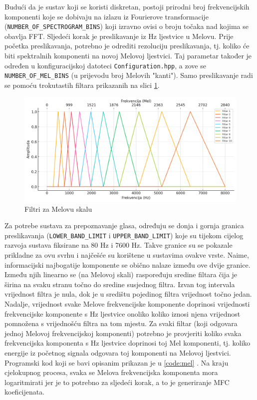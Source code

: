 Budući da je sustav koji se koristi diskretan, postoji prirodni broj frekvencijskih komponenti koje 
se dobivaju na izlazu iz Fourierove transformacije \\ (\texttt{NUMBER\_OF\_SPECTROGRAM\_BINS}) koji
izravno ovisi o broju točaka nad kojima se obavlja FFT. Sljedeći korak je 
preslikavanje iz Hz ljestvice u Melovu. Prije početka preslikavanja, potrebno
je odrediti rezoluciju preslikavanja, tj. koliko će biti spektralnih komponenti na 
novoj Melovoj ljestvici. Taj parametar također je određen u konfiguracijskoj datoteci
\texttt{Configuration.hpp}, a zove se \texttt{NUMBER\_OF\_MEL\_BINS} (u prijevodu broj Melovih
"kanti"). Samo preslikavanje radi se  pomoću trokutastih filtara prikazanih na slici 
\ref{pic:melfilter}.

\begin{figure}[htb]
    \centering
    \includegraphics[width=0.8\linewidth]{Chapters/struktura_sustava/generiranje_znacajki/melfiltar.png} 
    \caption{Filtri za Melovu skalu}
    \label{pic:melfilter}
\end{figure}

Za potrebe sustava za prepoznavanje glasa, određuju se donja i gornja granica preslikavanja 
(\texttt{LOWER\_BAND\_LIMIT} i \texttt{UPPER\_BAND\_LIMIT}) koje su tijekom cijelog razvoja sustava fiksirane
na 80 Hz i 7600 Hz. Takve granice su se pokazale prikladne za ovu svrhu i najčešće
su korištene u sustavima ovakve vrste. Naime, informacijski najbogatije komponente
se obično nalaze između ove dvije granice. Između njih linearno se (na Melovoj skali)
raspoređuju sredine filtara čija je širina na svaku stranu 
točno do sredine susjednog filtra. Izvan tog intervala vrijednost filtra je nula, dok je u središtu
pojedinog filtra vrijednost točno jedan. Nadalje, vrijednost svake Melove frekvencijske
komponente doprinosi vrijednosti frekvencijske komponente s Hz ljestvice onoliko koliko iznosi
njena vrijednost pomnožena s vrijednošću filtra na tom mjestu. Za svaki filtar (koji odgovara
jednoj Melovoj frekvencijskoj komponenti) potrebno je provjeriti koliko svaka frekvencijska komponenta 
s Hz ljestvice doprinosi toj Mel komponenti, tj. koliko energije iz početnog signala
odgovara toj komponenti na Melovoj ljestvici. Programski kod koji se bavi opisanim prikazan je u 
\ref{code:mel} . Na kraju cjelokupnog procesa, svaka se Melova frekvencijska
komponenta mora logaritmirati jer je to potrebno za sljedeći korak, a to je generiranje MFC koeficijenata.

